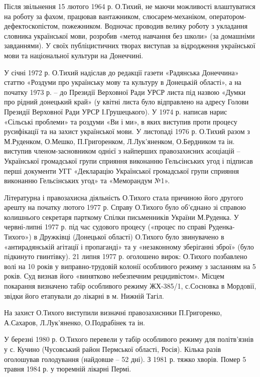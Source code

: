 Після звільнення 15 лютого 1964 р. О.Тихий, не маючи можливості влаштуватися на
роботу за фахом, працював вантажником, слюсарем-механіком,
оператором-дефектоскопістом, пожежником. Водночас проводив велику роботу з
укладання словника української мови, розробив «метод навчання без школи» (за
домашніми завданнями). У своїх публіцистичних творах виступав за відродження
української мови та національної культури на Донеччині.

У січні 1972 р. О.Тихий надіслав до редакції газети «Радянська Донеччина»
статтю «Роздуми про українську мову та культуру в Донецькій області», а на
початку 1973 р. – до Президії Верховної Ради УРСР листа під назвою «Думки про
рідний донецький край» (у квітні листа було відправлено на адресу Голови
Президії Верховної Ради УРСР І.Грушецького). У 1974 р. написав нарис «Сільські
проблеми» та роздуми «Ви і ми», в яких виступив проти процесу русифікації та на
захист української мови. У листопаді 1976 р. О.Тихий разом з М.Руденком,
О.Мешко, П.Григоренком, Л.Лук'яненком, О.Бердником та ін. виступив
членом-засновником однієї з найперших правозахисних асоціацій – Української
громадської групи сприяння виконанню Гельсінських угод і підписав перші
документи УГГ «Декларацію Української громадської групи сприяння виконанню
Гельсінських угод» та «Меморандум №1».

Літературна і правозахисна діяльність О.Тихого стала причиною його другого
арешту на початку лютого 1977 р. Справу О.Тихого було об'єднано зі справою
колишнього секретаря парткому Спілки письменників України М.Руденка. У
червні-липні 1977 р. під час судового процесу («процес по справі
Руденка-Тихого») в Дружківці (Донецької області) О.Тихого було звинувачено в
«антирадянській агітації і пропаганді» та у «незаконному зберіганні зброї»
(було підкинуто гвинтівку). 21 липня 1977 р. оголошено вирок: О.Тихого
позбавлено волі на 10 років у виправно-трудовій колонії особливого режиму з
засланням на 5 років. Суд визнав його «винятково небезпечним рецидивістом».
Місцем покарання визначено табір особливого режиму ЖХ-385/1, с.Сосновка в
Мордовії, звідки його етапували до лікарні в м. Нижній Тагіл.

На захист О.Тихого виступили визначні правозахисники П.Григоренко, А.Сахаров,
Л.Лук'яненко, О.Подрабінек та ін.

У березні 1980 р. О.Тихого перевели у табір особливого режиму для політв'язнів
у с. Кучино (Чусовський район Пермської області, Росія). Кілька разів
оголошував голодування (найдовше – 52 дні). З 1981 р. тяжко хворів. Помер 5
травня 1984 р. у тюремній лікарні Пермі.

